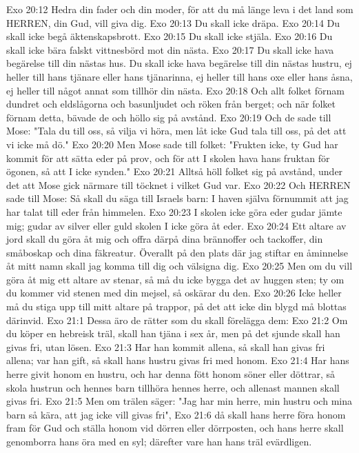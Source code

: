 Exo 20:12  Hedra din fader och din moder, för att du må länge leva i det land som HERREN, din Gud, vill giva dig.
Exo 20:13  Du skall icke dräpa.
Exo 20:14  Du skall icke begå äktenskapsbrott.
Exo 20:15  Du skall icke stjäla.
Exo 20:16  Du skall icke bära falskt vittnesbörd mot din nästa.
Exo 20:17  Du skall icke hava begärelse till din nästas hus. Du skall icke hava begärelse till din nästas hustru, ej heller till hans tjänare eller hans tjänarinna, ej heller till hans oxe eller hans åsna, ej heller till något annat som tillhör din nästa.
Exo 20:18  Och allt folket förnam dundret och eldslågorna och basunljudet och röken från berget; och när folket förnam detta, bävade de och höllo sig på avstånd.
Exo 20:19  Och de sade till Mose: "Tala du till oss, så vilja vi höra, men låt icke Gud tala till oss, på det att vi icke må dö."
Exo 20:20  Men Mose sade till folket: "Frukten icke, ty Gud har kommit för att sätta eder på prov, och för att I skolen hava hans fruktan för ögonen, så att I icke synden."
Exo 20:21  Alltså höll folket sig på avstånd, under det att Mose gick närmare till töcknet i vilket Gud var.
Exo 20:22  Och HERREN sade till Mose: Så skall du säga till Israels barn: I haven själva förnummit att jag har talat till eder från himmelen.
Exo 20:23  I skolen icke göra eder gudar jämte mig; gudar av silver eller guld skolen I icke göra åt eder.
Exo 20:24  Ett altare av jord skall du göra åt mig och offra därpå dina brännoffer och tackoffer, din småboskap och dina fäkreatur. Överallt på den plats där jag stiftar en åminnelse åt mitt namn skall jag komma till dig och välsigna dig.
Exo 20:25  Men om du vill göra åt mig ett altare av stenar, så må du icke bygga det av huggen sten; ty om du kommer vid stenen med din mejsel, så oskärar du den.
Exo 20:26  Icke heller må du stiga upp till mitt altare på trappor, på det att icke din blygd må blottas därinvid.
Exo 21:1  Dessa äro de rätter som du skall förelägga dem:
Exo 21:2  Om du köper en hebreisk träl, skall han tjäna i sex år, men på det sjunde skall han givas fri, utan lösen.
Exo 21:3  Har han kommit allena, så skall han givas fri allena; var han gift, så skall hans hustru givas fri med honom.
Exo 21:4  Har hans herre givit honom en hustru, och har denna fött honom söner eller döttrar, så skola hustrun och hennes barn tillhöra hennes herre, och allenast mannen skall givas fri.
Exo 21:5  Men om trälen säger: "Jag har min herre, min hustru och mina barn så kära, att jag icke vill givas fri",
Exo 21:6  då skall hans herre föra honom fram för Gud och ställa honom vid dörren eller dörrposten, och hans herre skall genomborra hans öra med en syl; därefter vare han hans träl evärdligen.
